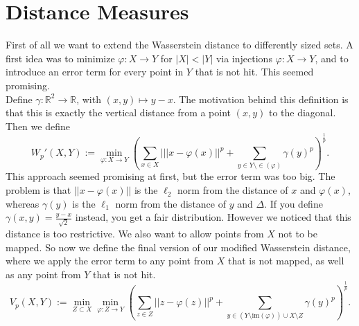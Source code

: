 \documentclass[11pt, a4paper, UKenglish]{article}
\newcommand{\bR}{\mathbb{R}}
\newcommand{\im}{\textrm{im}}
\begin{document}
    \section{Distance Measures}\label{sec:distance-measures}

    First of all we want to extend the Wasserstein distance to differently sized sets.
    A first idea was to minimize $\varphi:X\rightarrow Y$ for $|X|<|Y|$ via injections $\varphi:X\rightarrow Y$, and to introduce an error term for every point in $Y$ that is not hit.
    This seemed promising.\\
    Define $\gamma:\bR^2\rightarrow\bR$, with $(x,y)\mapsto y-x$.
    The motivation behind this definition is that this is exactly the vertical distance from a point $(x,y)$ to the diagonal.
    Then we define \[W_p'(X,Y):=\min_{\varphi:X\rightarrow Y}\left(\sum_{x\in X}|||x-\varphi(x)||^p + \sum_{y\in Y\setminus \in(\varphi)}\gamma(y)^p\right)^\frac{1}{p}.\]
    This approach seemed promising at first, but the error term was too big.
    The problem is that $||x-\varphi(x)||$ is the $\ell_2$ norm from the distance of $x$ and $\varphi(x)$, whereas $\gamma(y)$ is the $\ell_1$ norm from the distance of $y$ and $\Delta$.
    If you define $\gamma(x,y)=\frac{y-x}{\sqrt{2}}$ instead, you get a fair distribution.
    However we noticed that this distance is too restrictive.
    We also want to allow points from $X$ not to be mapped.
    So now we define the final version of our modified Wasserstein distance, where we apply the error term to any point from $X$ that is not mapped, as well as any point from $Y$ that is not hit.
    \[V_p(X,Y):=\min_{Z\subset{X}}\min_{\varphi:Z\rightarrow Y}\left(\sum_{z\in Z}||z-\varphi(z)||^p + \sum_{y\in (Y\setminus \im(\varphi))\cup X\setminus Z}\gamma(y)^p\right)^\frac{1}{p}.\]
\end{document}
